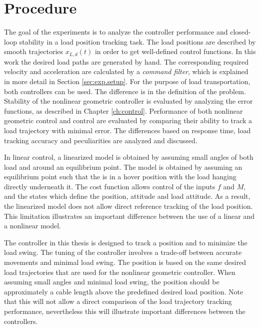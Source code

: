 \section{Procedure}\label{sec:exp.proc}
The goal of the experiments is to analyze the controller performance and closed-loop stability in a load position tracking task.
The load positions are described by smooth trajectories $ x_{L,d}(t) $ in order to get well-defined control functions.
In this work the desired load paths are generated by hand. 
The corresponding required velocity and acceleration are calculated by a \textit{command filter}, which is explained in more detail in Section \ref{sec:exp.setup}.
For the purpose of load transportation, both controllers can be used. The difference is in the definition of the problem.
Stability of the nonlinear geometric controller is evaluated by analyzing the error functions, as described in Chapter \ref{ch:control}.
Performance of both nonlinear geometric control and  control are evaluated by comparing their ability to track a load trajectory with minimal error. 
The differences based on response time, load tracking accuracy and peculiarities are analyzed and discussed.

In linear control, a linearized model is obtained by assuming small angles of both load and  around an equilibrium point. 
The model is obtained by assuming an equilibrium point such that the  is in a hover position with the load hanging directly underneath it.
The  cost function allows control of the inputs $ f $ and $ M $, and the states which define the  position,  attitude and load attitude. 
As a result, the linearized model does not allow direct reference tracking of the load position. 
This limitation illustrates an important difference between the use of a linear and a nonlinear model. 

The  controller in this thesis is designed to track a  position and to minimize the load swing. 
The tuning of the  controller involves a trade-off between accurate  movements and minimal load swing. 
The  position is based on the same desired load trajectories that are used for the nonlinear geometric controller. 
When assuming small angles and minimal load swing, the  position should be approximately a cable length above the predefined desired load position. 
Note that this will not allow a direct comparison of the load trajectory tracking performance, nevertheless this will illustrate important differences between the controllers. 
%

